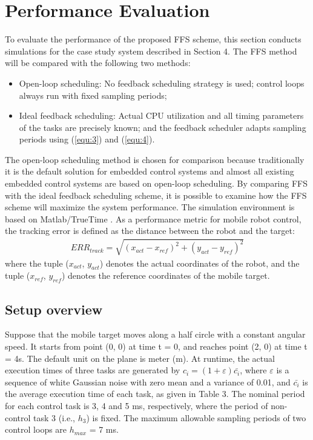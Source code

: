 \documentclass[12pt,a4paper]{ijicic}
\begin{document}
\section{Performance Evaluation}
\label{sec:5}

To evaluate the performance of the proposed FFS scheme,
this section conducts simulations for the case study system described in Section 4.
The FFS method will be compared with the following two methods:
\begin{itemize}
\item Open-loop scheduling: No feedback scheduling strategy is used; control loops
always run with fixed sampling periods;
\item Ideal feedback scheduling: Actual CPU utilization and all timing
parameters of the tasks are precisely known; and the feedback scheduler
adapts sampling periods using (\ref{equ:3}) and (\ref{equ:4}).
\end{itemize}

The open-loop scheduling method is chosen for comparison because traditionally
it is the default solution for embedded control systems and almost all existing
embedded control systems are based on open-loop scheduling. By comparing FFS with
the ideal feedback scheduling scheme, it is possible to examine how the FFS scheme
will maximize the system performance. The simulation environment is based on
Matlab/TrueTime \cite{R21}. As a performance metric for mobile robot control, the tracking
error is defined as the distance between the robot and the target:
\begin{equation} \label{eq:6}
\begin{split}
ERR_{track}=\sqrt{(x_{act}-x_{ref})^2+(y_{act}-y_{ref})^2}
\end{split}
\end{equation}
where the tuple ($x_{act}$, $y_{act}$) denotes the actual coordinates of the robot, and the tuple ($x_{ref}$, $y_{ref}$) denotes the reference coordinates of the mobile target.

\subsection{Setup overview}
Suppose that the mobile target moves along a half circle with a constant angular
speed. It starts from point (0, 0) at time t = 0, and reaches point (2, 0) at time
t = 4s. The default unit on the plane is meter (m). At runtime,
the actual execution times of three tasks are generated by $c_i=(1+\varepsilon)\bar{c_i}$,
where $\varepsilon$ is a sequence of white Gaussian noise with zero mean and a
variance of 0.01, and $\bar{c_i}$ is the average execution time of each task, as given
in Table 3. The nominal period for each control task is 3, 4 and 5 ms, respectively,
where the period of non-control task 3 (i.e., $h_3$) is fixed. The maximum
allowable sampling periods of two control loops are $h_{max}$ = 7 ms.
\end{document}

